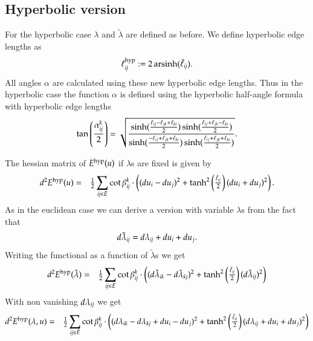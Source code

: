 \documentclass[Thesis]{subfiles}
\begin{document}
\subsection{Hyperbolic version}
\label{sec:hyperbolic_fuctional}

For the hyperbolic case $\lambda$ and $\tilde\lambda$ are defined as before. We define hyperbolic edge lengths as 
\begin{equation}
\ell^{\rm hyp}_{\it ij} := 2\operatorname{arsinh}(\tilde \ell_{\it ij}).\label{eq:hyperbolic_lengths}
\end{equation}
All angles $\alpha$ are calculated using these new hyperbolic edge lengths.
Thus in the hyperbolic case the function $\alpha$ is defined using the hyperbolic half-angle formula with hyperbolic edge lengths
\[
  \tan\left(\frac{\alpha^k_{\it ij}}{2}\right)=
  \sqrt{\frac{
      \sinh(\frac{\ell_{ij}-\ell_{jk}+\ell_{ki}}{2})
      \sinh(\frac{\ell_{ij}+\ell_{jk}-\ell_{ki}}{2})
    }{
      \sinh(\frac{-\ell_{ij}+\ell_{jk}+\ell_{ki}}{2})
      \sinh(\frac{\ell_{ij}+\ell_{jk}+\ell_{ki}}{2})
    }}.
\]

The hessian matrix of $E^{\rm hyp}(u)$ if $\lambda$s are fixed is given by
\begin{eqnarray*}
d^2E^{\rm hyp}(u)
&=&\tfrac{1}{2}\sum_{\it ij\in \bar E} \cot\beta^k_{\it ij} \cdot \left((du_i-du_j)^2+
\tanh^2\left(\tfrac{\tilde \ell_{\it ij}}{2}\right)(du_i+du_j)^2\right).
\end{eqnarray*}
 As in the euclidean case we can derive a version with variable $\lambda$s from the fact that 
\begin{equation*}
d\tilde \lambda_{\it ij}=d\lambda_{\it ij}+du_i+du_j.
\end{equation*}
Writing the functional as a function of $\tilde \lambda$s we get 
\begin{eqnarray*}
 d^2E^{\rm hyp}(\tilde \lambda) &=&
 \tfrac{1}{2}\sum_{\it ij\in \bar{E}} \cot\beta^k_{\it ij} \cdot \left((d\tilde\lambda_{\it ik}-d\tilde\lambda_{\it kj})^2+\tanh^2\left(\tfrac{\tilde \ell_{\it ij}}{2}\right)(d\tilde\lambda_{\it ij})^2\right)
\end{eqnarray*}
With non vanishing $d\lambda_{\it ij}$ we get
\begin{eqnarray*}
d^2E^{\rm hyp}(\lambda, u)
&=& \tfrac{1}{2}\sum_{\it ij\in \bar{E}} \cot\beta^k_{\it ij} \cdot 
 \left((d\lambda_{\it ik}-d\lambda_{\it kj} +  du_i-du_j)^2+\tanh^2\left(\tfrac{\tilde \ell_{\it ij}}{2}\right)(d\lambda_{\it ij} +du_i+du_j)^2\right)
\end{eqnarray*}
\end{document}
